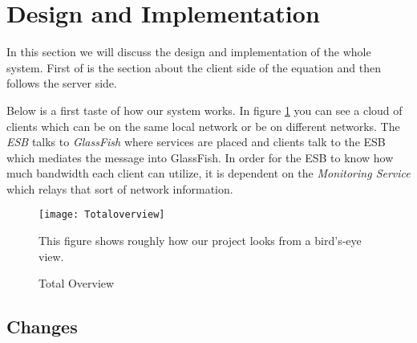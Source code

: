 \section{Design and Implementation}\label{Design and Implementation}
	In this section we will discuss the design and implementation of the whole system. First of is the section about the client side of the equation and then follows the server side. 
	
	Below is a first taste of how our system works. In figure \ref{fig:totaloverview} you can see a cloud of clients which can be on the same local network or be on different networks. The \textit{ESB} talks to \textit{GlassFish} where services are placed and clients talk to the ESB which mediates the message into GlassFish. In order for the ESB to know how much bandwidth each client can utilize, it is dependent on the \textit{Monitoring Service} which relays that sort of network information.
    
    \begin{figure}[H]
        \centering
        \texttt{[image: Totaloverview]}
        \caption{Total Overview}
        This figure shows roughly how our project looks from a bird's-eye view.
        \label{fig:totaloverview}
    \end{figure}

    
    
    
    \subsection{Changes}\label{Changes}
